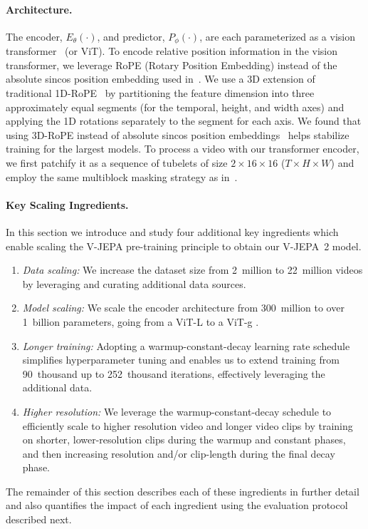 \documentclass[]{fairmeta}
\newcommand{\model}{V-JEPA~2\xspace}
\begin{document}
\paragraph{\bf Architecture.} The encoder, $E_\theta(\cdot)$, and predictor, $P_\phi(\cdot)$, are each parameterized as a vision transformer~\citep{dosovitskiy2020image} (or ViT).
To encode relative position information in the vision transformer, we leverage RoPE (Rotary Position Embedding) instead of the absolute sincos position embedding used in~\citet{bardes2024revisiting}. We use a 3D extension of traditional 1D-RoPE~\citep{su2024roformer} by partitioning the feature dimension into three approximately equal segments (for the temporal, height, and width axes) and applying the 1D rotations separately to the segment for each axis.
We found that using 3D-RoPE instead of absolute sincos position embeddings~\citep{vaswani2017attention} helps stabilize training for the largest models.
To process a video with our transformer encoder, we first patchify it as a sequence of tubelets of size $2\times16\times16$ ($T\times H\times W$) and employ the same multiblock masking strategy as in~\citet{bardes2024revisiting}.

\paragraph{\bf Key Scaling Ingredients.} In this section we introduce and study four additional key ingredients which enable scaling the V-JEPA pre-training principle to obtain our \model model.
\begin{enumerate}
\item \emph{Data scaling:} We increase the dataset size from 2~million to 22~million videos by leveraging and curating additional data sources.

\item \emph{Model scaling:} We scale the encoder architecture from 300~million to over 1~billion parameters, going from a ViT-L to a ViT-g \citep{zhai2022scaling}.

\item \emph{Longer training:} Adopting a warmup-constant-decay learning rate schedule simplifies hyperparameter tuning and enables us to extend training from 90~thousand up to 252~thousand iterations, effectively leveraging the additional data.

\item \emph{Higher resolution:} We leverage the warmup-constant-decay schedule to efficiently scale to higher resolution video and longer video clips by training on shorter, lower-resolution clips during the warmup and constant phases, and then increasing resolution and/or clip-length during the final decay phase.
\end{enumerate}
The remainder of this section describes each of these ingredients in further detail and also quantifies the impact of each ingredient using the evaluation protocol described next.
\end{document}
